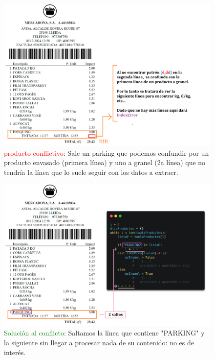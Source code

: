 \documentclass{beamer}
\begin{document}
	\begin{frame}	
		\begin{figure}
			\centering
			\includegraphics[width=.75\linewidth]{imgEspecifiques/ticketExtraccioP}
			\caption{\textcolor{red}{producto conflictivo}: Sale un parking que podemos confundir por un producto envasado (primera línea) y uno a granel (2a línea) que no tendría la línea que lo suele seguir con los datos a extraer.}
			\label{fig:ticketextraccionP}
		\end{figure}
	\end{frame}
	
	
	\begin{frame}	
		\begin{figure}
			\centering
			\includegraphics[width=.75\linewidth]{imgEspecifiques/ticketExtraccioQ}
			\caption{\textcolor{green}{Solución al conflicto}: Saltamos la línea que contiene "PARKING" y la siguiente sin llegar a procesar nada de su contenido: no es de interés.}
			\label{fig:ticketextraccionQ}
		\end{figure}
	\end{frame}
	
\end{document}
